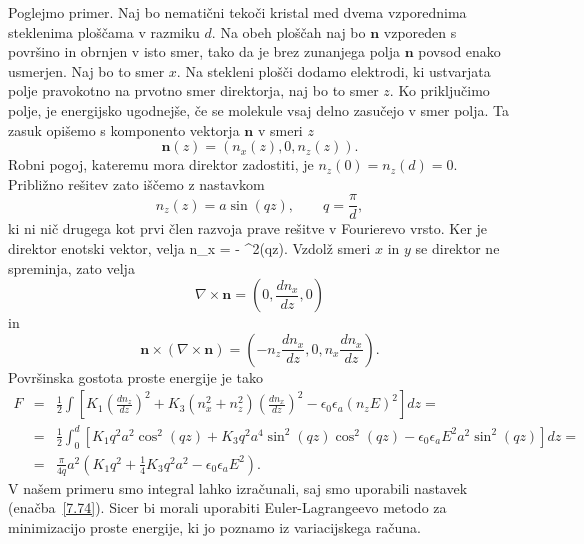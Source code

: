 Poglejmo primer. Naj bo nematični tekoči kristal med dvema vzporednima
steklenima ploščama v razmiku $d$. Na obeh ploščah naj bo $\mathbf{n}$ vzporeden
s površino in obrnjen v isto smer, tako da je brez zunanjega 
polja $\mathbf{n}$ povsod enako usmerjen. Naj bo to smer $x$.
Na stekleni plošči dodamo elektrodi, ki ustvarjata polje pravokotno na 
prvotno smer direktorja, naj bo to smer $z$.
Ko priključimo polje, je energijsko ugodnejše, če
se molekule vsaj delno zasučejo v smer polja. Ta zasuk opišemo s
komponento vektorja $\mathbf{n}$ v smeri $z$
\begin{equation}
\mathbf{n}(z)=(n_{x}(z),0,n_{z}(z)).
\label{7.73}
\end{equation}
Robni pogoj, kateremu mora direktor zadostiti,
je $n_{z}(0)=n_{z}(d)=0$. Približno rešitev zato iščemo z nastavkom 
\begin{equation}
n_{z}(z)=a\sin (qz), \qquad q=\frac{\pi}{d},
\label{7.74}
\end{equation}
ki ni nič drugega kot prvi člen razvoja prave rešitve v Fourierevo vrsto.
Ker je direktor enotski vektor, velja
\beq
n_x =   - \sin^2(qz).
\eeq
Vzdolž smeri $x$ in $y$ se direktor ne spreminja, zato velja
\begin{equation}
\nabla\times\mathbf{n}=(0,\frac{dn_{x}}{dz},0)
\label{7.75}
\end{equation}
 in 
\begin{equation}
\mathbf{n}\times(\nabla\times\mathbf{n})=(-n_{z}\frac{dn_{x}}{dz},0,
n_{x}\frac{dn_{x}}{dz}).
\label{7.76}
\end{equation}
Površinska gostota proste energije je tako 
\begin{eqnarray}
F & = & \frac{1}{2}\int\left[K_{1}\left(\frac{dn_{z}}{dz}\right)^{2}+K_{3}(n_x^2+n_{z}^{2})
\left(\frac{dn_{x}}{dz}\right)^{2}-
\epsilon_{0}\epsilon_{a}(n_{z}E)^{2}\right]dz=\nonumber \\
 & = & \frac{1}{2}\int_{0}^{d}
 [K_{1}q^{2}a^{2}\cos^{2}(qz)+K_{3}q^{2}a^{4}\sin^{2}(qz)\cos^2(qz)-
 \epsilon_{0}\epsilon_{a}E^2a^{2}\sin^{2}(qz)]dz=\nonumber \\
 & = & \frac{\pi}{4q}a^2\left( K_{1}q^{2}+\frac{1}{4}K_{3}q^{2}a^2-\epsilon_{0}\epsilon_{a}E^2\right).
\end{eqnarray}
V našem primeru smo integral lahko izračunali, saj smo uporabili nastavek (enačba~\ref{7.74}).
Sicer bi morali uporabiti Euler-Lagrangeevo metodo za minimizacijo proste energije, ki 
jo poznamo iz variacijskega računa.

